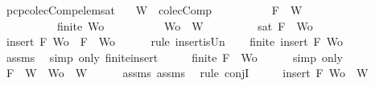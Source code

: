 \begin{isabellebody}
\ pcp{\isacharunderscore}colecComp{\isacharunderscore}elem{\isacharunderscore}sat{\isacharcolon}\isanewline
\ \ \ {\isachardoublequoteopen}W\ {\isasymin}\ colecComp{\isachardoublequoteclose}\isanewline
\ \ \ \ \ \ \ \ \ \ {\isachardoublequoteopen}F\ {\isasymin}\ W{\isachardoublequoteclose}\isanewline
\ \ \ \ \ \ \ \ \ \ {\isachardoublequoteopen}finite\ Wo{\isachardoublequoteclose}\isanewline
\ \ \ \ \ \ \ \ \ \ {\isachardoublequoteopen}Wo\ {\isasymsubseteq}\ W{\isachardoublequoteclose}\isanewline
\ \ \ \ \ \ \ \ \ {\isachardoublequoteopen}sat\ {\isacharparenleft}{\isacharbraceleft}F{\isacharbraceright}\ {\isasymunion}\ Wo{\isacharparenright}{\isachardoublequoteclose}\isanewline
%
\isadelimproof
%
\endisadelimproof
%
\isatagproof
{}\isamarkupfalse%
\ {\isacharminus}\isanewline
\ \ \isamarkupfalse%
\ {}{\isacharcolon}{\isachardoublequoteopen}insert\ F\ Wo\ {\isacharequal}\ {\isacharbraceleft}F{\isacharbraceright}\ {\isasymunion}\ Wo{\isachardoublequoteclose}\isanewline
\ \ \ \ \isamarkupfalse%
\ {\isacharparenleft}rule\ insert{\isacharunderscore}is{\isacharunderscore}Un{\isacharparenright}\isanewline
\ \ \isamarkupfalse%
\ {\isachardoublequoteopen}finite\ {\isacharparenleft}insert\ F\ Wo{\isacharparenright}{\isachardoublequoteclose}\isanewline
\ \ \ \ \isamarkupfalse%
\ assms{\isacharparenleft}{}{\isacharparenright}\ \isamarkupfalse%
\ {\isacharparenleft}simp\ only{\isacharcolon}\ finite{\isacharunderscore}insert{\isacharparenright}\isanewline
\ \ \isamarkupfalse%
\ \isamarkupfalse%
\ {\isachardoublequoteopen}finite\ {\isacharparenleft}{\isacharbraceleft}F{\isacharbraceright}\ {\isasymunion}\ Wo{\isacharparenright}{\isachardoublequoteclose}\isanewline
\ \ \ \ \isamarkupfalse%
\ {\isacharparenleft}simp\ only{\isacharcolon}\ {}{\isacharparenright}\ \isanewline
\ \ \isamarkupfalse%
\ {\isachardoublequoteopen}F\ {\isasymin}\ W\ {\isasymand}\ Wo\ {\isasymsubseteq}\ W{\isachardoublequoteclose}\isanewline
\ \ \ \ \isamarkupfalse%
\ assms{\isacharparenleft}{}{\isacharparenright}\ assms{\isacharparenleft}{}{\isacharparenright}\ \isamarkupfalse%
\ {\isacharparenleft}rule\ conjI{\isacharparenright}\isanewline
\ \ \isamarkupfalse%
\ \isamarkupfalse%
\ {\isachardoublequoteopen}insert\ F\ Wo\ {\isasymsubseteq}\ W{\isachardoublequoteclose}\isanewline

\end{isabellebody}
